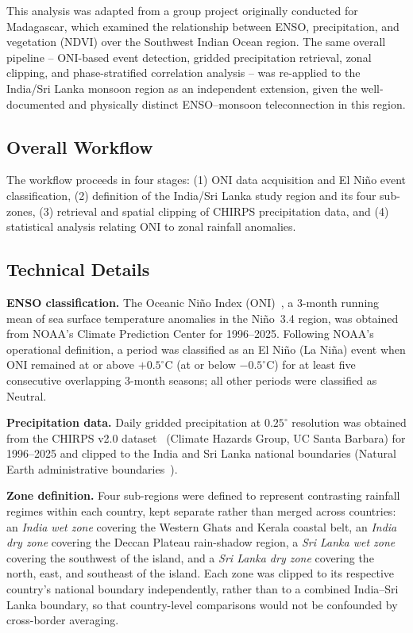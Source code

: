 \documentclass{article}
\begin{document}
This analysis was adapted from a group project originally conducted for Madagascar,
which examined the relationship between ENSO, precipitation, and vegetation (NDVI) over
the Southwest Indian Ocean region. The same overall pipeline -- ONI-based event
detection, gridded precipitation retrieval, zonal clipping, and phase-stratified
correlation analysis -- was re-applied to the India/Sri Lanka monsoon region as an
independent extension, given the well-documented and physically distinct
ENSO--monsoon teleconnection in this region.

\subsection{Overall Workflow}
The workflow proceeds in four stages: (1) ONI data acquisition and El Ni\~{n}o event
classification, (2) definition of the India/Sri Lanka study region and its four
sub-zones, (3) retrieval and spatial clipping of CHIRPS precipitation data, and (4)
statistical analysis relating ONI to zonal rainfall anomalies.

\subsection{Technical Details}

\textbf{ENSO classification.} The Oceanic Ni\~{n}o Index (ONI)~\cite{noaa_oni}, a
3-month running mean of sea surface temperature anomalies in the Ni\~{n}o~3.4 region,
was obtained from NOAA's Climate Prediction Center for 1996--2025. Following NOAA's operational
definition, a period was classified as an El Ni\~{n}o (La Ni\~{n}a) event when ONI
remained at or above $+0.5^{\circ}$C (at or below $-0.5^{\circ}$C) for at least five
consecutive overlapping 3-month seasons; all other periods were classified as Neutral.

\textbf{Precipitation data.} Daily gridded precipitation at $0.25^{\circ}$ resolution
was obtained from the CHIRPS v2.0 dataset~\cite{funk2015chirps} (Climate Hazards Group,
UC Santa Barbara) for 1996--2025 and clipped to the India and Sri Lanka national
boundaries (Natural Earth administrative boundaries~\cite{naturalearth}).

\textbf{Zone definition.} Four sub-regions were defined to represent contrasting
rainfall regimes within each country, kept separate rather than merged across
countries: an \emph{India wet zone} covering the Western Ghats and Kerala coastal belt,
an \emph{India dry zone} covering the Deccan Plateau rain-shadow region, a \emph{Sri
Lanka wet zone} covering the southwest of the island, and a \emph{Sri Lanka dry zone}
covering the north, east, and southeast of the island. Each zone was clipped to its
respective country's national boundary independently, rather than to a combined
India--Sri Lanka boundary, so that country-level comparisons would not be confounded by
cross-border averaging.
\end{document}
